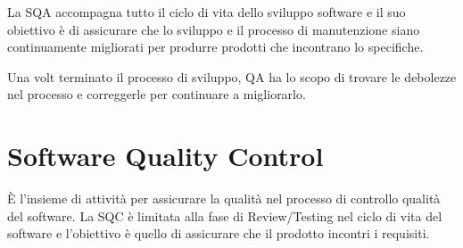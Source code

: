 \documentclass[11pt,a4paper]{book}
\begin{document}
La SQA accompagna tutto il ciclo di vita dello sviluppo software e il suo obiettivo è di assicurare che lo sviluppo e il processo di manutenzione siano continuamente migliorati per produrre prodotti che incontrano lo specifiche.

Una volt terminato il processo di sviluppo, QA ha lo scopo di trovare le debolezze nel processo e correggerle per continuare a migliorarlo.

\section{Software Quality Control}
È l'insieme di attività per assicurare la qualità nel processo di controllo qualità del software. La SQC è limitata alla fase di Review/Testing nel ciclo di vita del software e l'obiettivo è quello di assicurare che il prodotto incontri i requisiti.
\end{document}
